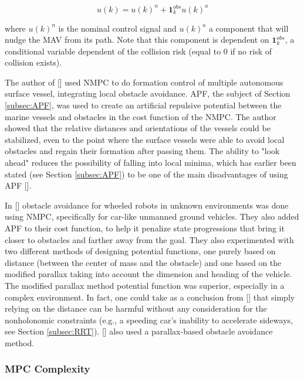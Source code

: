 \begin{equation}
u(k) = u(k)^n + \textbf{1}^{obs}_k u(k)^a
\end{equation}

where $u(k)^n$ is the nominal control signal and $u(k)^a$ a component that will nudge the \gls{MAV} from its path. Note that this component is dependent on $\textbf{1}^{obs}_k$, a conditional variable dependent of the collision risk (equal to 0 if no risk of collision exists).

The author of [\citeauthor{Fahimi2007}] used \gls{NMPC} to do formation control of multiple autonomous surface vessel, integrating local obstacle avoidance. \gls{APF}, the subject of Section \ref{subsec:APF}, was used to create an artificial repulsive potential between the marine vessels and obstacles in the cost function of the \gls{NMPC}. The author showed that the relative distances and orientations of the vessels could be stabilized, even to the point where the surface vessels were able to avoid local obstacles and regain their formation after passing them. The ability to "look ahead" reduces the possibility of falling into local minima, which has earlier been stated (see Section \ref{subsec:APF}) to be one of the main disadvantages of using \gls{APF} [\citeauthor{Park2009}].

In [\citeauthor{Yoon2008a}] obstacle avoidance for wheeled robots in unknown environments was done using \gls{NMPC}, specifically for car-like unmanned ground vehicles. They also added \gls{APF} to their cost function, to help it penalize state progressions that bring it closer to obstacles and farther away from the goal. They also experimented with two different methods of designing potential functions, one purely based on distance (between the center of mass and the obstacle) and one based on the modified parallax taking into account the dimension and heading of the vehicle. The modified parallax method potential function was superior, especially in a complex environment. In fact, one could take as a conclusion from [\citeauthor{Yoon2008a}] that simply relying on the distance can be harmful without any consideration for the nonholonomic constraints (e.g., a speeding car's inability to accelerate sideways, see Section \ref{subsec:RRT}). [\citeauthor{Park2009}] also used a parallax-based obstacle avoidance method.


\subsubsection*{MPC Complexity}

